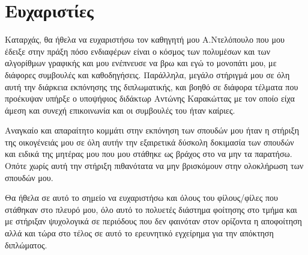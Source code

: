 \section*{Ευχαριστίες}
\thispagestyle{empty}

Καταρχάς, θα ήθελα να ευχαριστήσω τον καθηγητή μου Α.Ντελόπουλο που μου έδειξε στην πράξη πόσο ενδιαφέρων είναι ο κόσμος των πολυμέσων και των αλγορίθμων γραφικής και μου ενέπνευσε να βρω και εγώ το μονοπάτι μου, με διάφορες συμβουλές και καθοδηγήσεις. Παράλληλα, μεγάλο στήριγμά μου σε όλη αυτή την διάρκεια εκπόνησης της διπλωματικής, και βοηθό σε διάφορα τέλματα που προέκυψαν υπήρξε ο υποψήφιος διδάκτωρ Αντώνης Καρακώττας με τον οποίο είχα άμεση και συνεχή επικοινωνία και οι συμβουλές του ήταν καίριες.

Αναγκαίο και απαραίτητο κομμάτι στην εκπόνηση των σπουδών μου ήταν η στήριξη της οικογένειάς μου σε όλη αυτήν την εξαιρετικά δύσκολη δοκιμασία των σπουδών και ειδικά της μητέρας μου που μου στάθηκε ως βράχος στο να μην τα παρατήσω. Οπότε χωρίς αυτή την στήριξη πιθανότατα να μην βρισκόμουν στην ολοκλήρωση των σπουδών μου. 

Θα ήθελα σε αυτό το σημείο να ευχαριστήσω και όλους του φίλους/φίλες που στάθηκαν στο πλευρό μου, όλο αυτό το πολυετές διάστημα φοίτησης στο τμήμα και με στήριξαν ψυχολογικά σε περιόδους που δεν φαινόταν στον ορίζοντα η αποφοίτηση αλλά και τώρα στο τέλος σε αυτό το ερευνητικό εγχείρημα για την απόκτηση διπλώματος.
